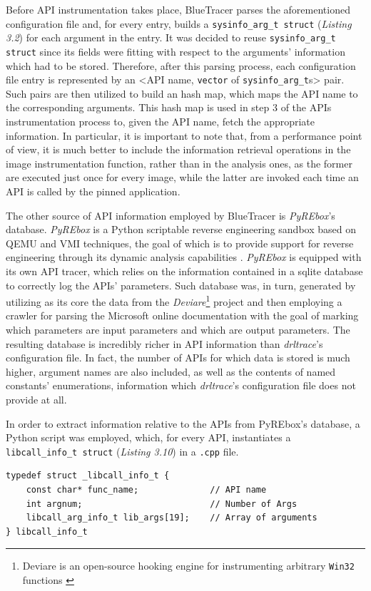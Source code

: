 Before API instrumentation takes place, BlueTracer parses the aforementioned configuration file and, for every entry, builds a \texttt{sysinfo\_arg\_t struct} (\textit{Listing 3.2}) for each argument in the entry. It was decided to reuse \texttt{sysinfo\_arg\_t struct} since its fields were fitting with respect to the arguments' information which had to be stored. Therefore, after this parsing process, each configuration file entry is represented by an <API name, \texttt{vector} of \texttt{sysinfo\_arg\_t}s> pair. Such pairs are then utilized to build an hash map, which maps the API name to the corresponding arguments. This hash map is used in step 3 of the APIs instrumentation process to, given the API name, fetch the appropriate information. In particular, it is important to note that, from a performance point of view, it is much better to include the information retrieval operations in the image instrumentation function, rather than in the analysis ones, as the former are executed just once for every image, while the latter are invoked each time an API is called by the pinned application.

The other source of API information employed by BlueTracer is \textit{PyREbox}'s database. \textit{PyREbox} is a Python scriptable reverse engineering sandbox based on QEMU and VMI techniques, the goal of which is to provide support for reverse engineering through its dynamic analysis capabilities \cite{Pyrebox}. \textit{PyREbox} is equipped with its own API tracer, which relies on the information contained in a sqlite database to correctly log the APIs' parameters. Such database was, in turn, generated by utilizing as its core the data from the \textit{Deviare}\footnote{Deviare is an open-source hooking engine for instrumenting arbitrary \texttt{Win32} functions \cite{Deviare}} project and then employing a crawler for parsing the Microsoft online documentation with the goal of marking which parameters are input parameters and which are output parameters. The resulting database is incredibly richer in API information than \textit{drltrace}'s configuration file. In fact, the number of APIs for which data is stored is much higher, argument names are also included, as well as the contents of named constants' enumerations, information which \textit{drltrace}'s configuration file does not provide at all.

In order to extract information relative to the APIs from PyREbox's database, a Python script was employed, which, for every API, instantiates a \texttt{libcall\_info\_t struct} (\textit{Listing 3.10}) in a \texttt{.cpp} file.
\\
\begin{lstlisting}[caption={\texttt{struct} containing API-related information from PyREbox's database},captionpos=b]
typedef struct _libcall_info_t {
	const char* func_name;     			// API name
	int argnum;				   			// Number of Args
	libcall_arg_info_t lib_args[19];	// Array of arguments
} libcall_info_t
\end{lstlisting}
\vspace{1cm}

